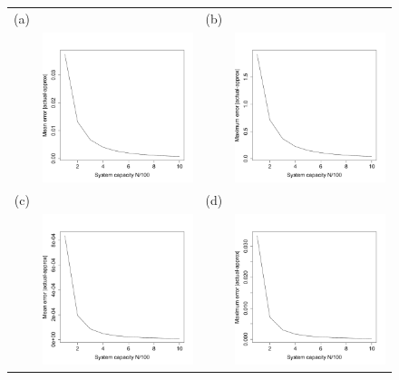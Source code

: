      \begin{figure}[th]
\centering
   \begin{tabular}{rrrr}
   (a)&&(b)&\\
  &\includegraphics[width=2.5in]{FDGmeanerr.pdf} && \includegraphics[width=2.5in]{FDGmaxerr.pdf} \\
  (c)&&(d)&\\
  &\includegraphics[width=2.5in]{FDGtmeanerr.pdf} && \includegraphics[width=2.5in]{FDGtmaxerr.pdf} \end{tabular}

\end{figure}
